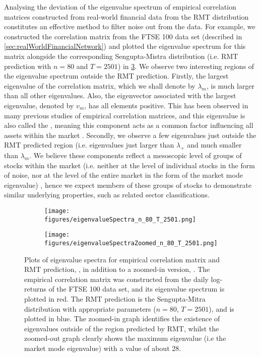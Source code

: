 Analysing the deviation of the eigenvalue spectrum of empirical correlation matrices constructed from real-world financial data from the RMT distribution constitutes an effective method to filter noise out from the data.
For example, we constructed the correlation matrix from the FTSE 100 data set (described in \cref{sec:realWorldFinancialNetwork}) and plotted the eigenvalue spectrum for this matrix alongside the corresponding Sengupta-Mistra distribution (i.e. RMT prediction with $n = 80$ and $T = 2501$) in \cref{fig:eigenvalueSpectra}.
We observe two interesting regions of the eigenvalue spectrum outside the RMT prediction. Firstly, the largest eigenvalue of the correlation matrix, which we shall denote by $\lambda_{m}$, is much larger than all other eigenvalues. Also, the eigenvector associated with the largest eigenvalue, denoted by $v_{m}$, has all elements positive. This has been observed in many previous studies of empirical correlation matrices, and this eigenvalue is also called the  \cite{FPW+11,MG13}, meaning this component acts as a common factor influencing all assets within the market \cite{MG13}. Secondly, we observe a few eigenvalues just outside the RMT predicted region (i.e. eigenvalues just larger than $\lambda_{+}$ and much smaller than $\lambda_{m}$. We believe these components reflect a mesoscopic level of groups of stocks within the market (i.e. neither at the level of individual stocks in the form of noise, nor at the level of the entire market in the form of the market mode eigenvalue) \cite{MG13}, hence we expect members of these groups of stocks to demonstrate similar underlying properties, such as related sector classifications.

\begin{figure}
	\centering
	\begin{subfigure}{.5\textwidth}
		\centering
		\texttt{[image: figures/eigenvalueSpectra\_n\_80\_T\_2501.png]}
		\caption{}
		\label{fig:eigenvalueSpectrumOriginal}
	\end{subfigure}%
	\begin{subfigure}{.5\textwidth}
		\centering
		\texttt{[image: figures/eigenvalueSpectraZoomed\_n\_80\_T\_2501.png]}
		\caption{}
		\label{fig:eigenvalueSpectrumZoomed}
	\end{subfigure}
	\caption[Plots of empirical and RMT predicted eigenvalue spectrum]{\label{fig:eigenvalueSpectra} Plots of eigenvalue spectra for empirical correlation matrix and RMT prediction, , in addition to a zoomed-in version, . The empirical correlation matrix was constructed from the daily log-returns of the FTSE 100 data set, and its eigenvalue spectrum is plotted in red. The RMT prediction is the Sengupta-Mitra distribution with appropriate parameters ($n = 80$, $T = 2501$), and is plotted in blue. The zoomed-in graph identifies the existence of eigenvalues outside of the region predicted by RMT, whilst the zoomed-out graph clearly shows the maximum eigenvalue (i.e the market mode eigenvalue) with a value of about 28.}
\end{figure}


